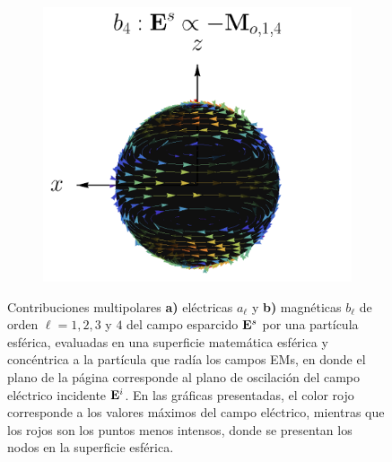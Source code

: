 \documentclass[letterpaper,11pt] {article}
\begin{document}
\begin{figure}[h]
\begin{subfigure}{.9\linewidth}
		\includegraphics[scale=.25]{1-Teoria/figs/Mo14_static_crop.png}%
		\end{subfigure}
		\caption{Contribuciones multipolares \textbf{a)} eléctricas $a_\ell$ y \textbf{b)} magnéticas $b_\ell$ de orden $\ell = 1,2,3$ y $4$ del campo esparcido $\vb{E}^s$ por una partícula esférica, evaluadas en una superficie matemática esférica y concéntrica a la partícula que radía los campos EMs, en donde el plano de la página corresponde al plano de oscilación del campo eléctrico incidente $\vb{E}^i$. En las gráficas presentadas, el color rojo corresponde a los valores máximos del campo eléctrico, mientras que los rojos son los puntos menos intensos, donde se presentan los nodos en la superficie esférica.}
		\label{fig:Multipolos}
	\end{figure}
\end{document}
